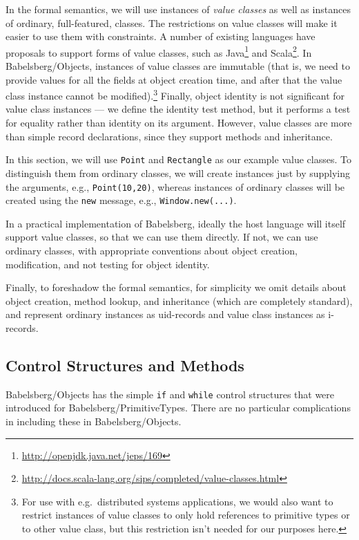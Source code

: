 \documentclass{article}
\begin{document}
In the formal semantics, we will use instances of \emph{value classes}
as well as instances of ordinary, full-featured, classes.  The
restrictions on value classes will make it easier to use them with
constraints.  A number of existing languages have proposals to support
forms of value classes, such as Java\footnote{\url{http://openjdk.java.net/jeps/169}} and Scala\footnote{\url{http://docs.scala-lang.org/sips/completed/value-classes.html}}.
In Babelsberg/Objects, instances of value
classes are immutable (that is, we need to provide values for all the
fields at object creation time, and after that the value class instance
cannot be modified).\footnote{For use with e.g.\ distributed systems 
applications, we would also want to restrict instances of value
classes to only hold references to primitive types or to other value
class, but this restriction isn't needed for our purposes here.}
Finally, object identity is not significant for
value class instances --- we define the identity test method, but it
performs a test for equality rather than identity on its argument.
However, value classes are more than simple record declarations, since
they support methods and inheritance.

In this section, we will use \verb|Point| and \verb|Rectangle| as our
example value classes.  To distinguish them from ordinary classes, we
will create instances just by supplying the arguments, e.g.,
\verb|Point(10,20)|, whereas instances of ordinary classes will be
created using the \verb|new| message, e.g., \verb|Window.new(...)|.


In a practical implementation of Babelsberg, ideally the host language
will itself support value classes, so that we can use them directly.
If not, we can use ordinary classes, with appropriate conventions
about object creation, modification, and not testing for object identity.

Finally, to foreshadow the formal semantics, for simplicity we omit
details about object creation, method lookup, and inheritance (which
are completely standard), and represent ordinary instances as
uid-records and value class instances as i-records.

\subsection{Control Structures and Methods}

Babelsberg/Objects has the simple \verb|if| and \verb|while| control
structures that were introduced for Babelsberg/PrimitiveTypes.  There
are no particular complications in including these in
Babelsberg/Objects.
\end{document}
